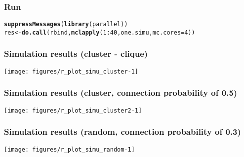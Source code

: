 \documentclass[10pt, c, xcolor=x11names]{beamer}\usepackage[]{graphicx}\usepackage[]{color}
\makeatletter
\newcommand{\hlnum}[1]{\textcolor[rgb]{0.686,0.059,0.569}{#1}}%
\newcommand{\hlopt}[1]{\textcolor[rgb]{0,0,0}{#1}}%
\newcommand{\hlstd}[1]{\textcolor[rgb]{0.345,0.345,0.345}{#1}}%
\newcommand{\hlkwb}[1]{\textcolor[rgb]{0.69,0.353,0.396}{#1}}%
\newcommand{\hlkwc}[1]{\textcolor[rgb]{0.333,0.667,0.333}{#1}}%
\newcommand{\hlkwd}[1]{\textcolor[rgb]{0.737,0.353,0.396}{\textbf{#1}}}%
\newenvironment{kframe}{%
 \def\at@end@of@kframe{}%
 \ifinner\ifhmode%
  \def\at@end@of@kframe{\end{minipage}}%
  \begin{minipage}{\columnwidth}%
 \fi\fi%
 \def\FrameCommand##1{\hskip\@totalleftmargin \hskip-\fboxsep
 \colorbox{shadecolor}{##1}\hskip-\fboxsep
     \hskip-\linewidth \hskip-\@totalleftmargin \hskip\columnwidth}%
 \MakeFramed {\advance\hsize-\width
   \@totalleftmargin\z@ \linewidth\hsize
   \@setminipage}}%
 {\par\unskip\endMakeFramed%
 \at@end@of@kframe}
\newenvironment{knitrout}{}{} %
\makeatother
\begin{document}
\begin{frame}[fragile]
  \frametitle{Run}

\begin{knitrout}\scriptsize
{}\color{fgcolor}\begin{kframe}
\begin{alltt}
\hlkwd{suppressMessages}\hlstd{(}\hlkwd{library}\hlstd{(parallel))}
\hlstd{res} \hlkwb{<-} \hlkwd{do.call}\hlstd{(rbind,} \hlkwd{mclapply}\hlstd{(}\hlnum{1}\hlopt{:}\hlnum{40}\hlstd{, one.simu,} \hlkwc{mc.cores}\hlstd{=}\hlnum{4}\hlstd{))}
\end{alltt}
\end{kframe}
\end{knitrout}

\end{frame}

\begin{frame}[fragile]
  \frametitle{Simulation results (cluster - clique)}

\begin{knitrout}\scriptsize
{}\color{fgcolor}
\texttt{[image: figures/r\_plot\_simu\_cluster-1]} 

\end{knitrout}




\end{frame}


\begin{frame}[fragile]
  \frametitle{Simulation results (cluster, connection probability of 0.5)}

\begin{knitrout}\scriptsize
{}\color{fgcolor}
\texttt{[image: figures/r\_plot\_simu\_cluster2-1]} 

\end{knitrout}



\end{frame}

\begin{frame}[fragile]
  \frametitle{Simulation results (random, connection probability of 0.3)}

\begin{knitrout}\scriptsize
{}\color{fgcolor}
\texttt{[image: figures/r\_plot\_simu\_random-1]} 

\end{knitrout}

\end{frame}
\end{document}
